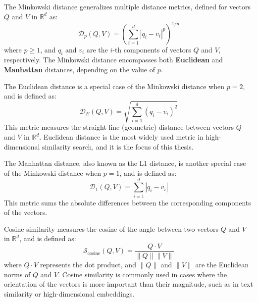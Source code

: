 \begin{definition}
    The Minkowski distance generalizes multiple distance metrics, defined for vectors \(Q\) and \(V\) in \(\mathbb{R}^d\) as:
    \begin{equation}
        \mathcal{D}_p(Q, V) = \left( \sum_{i=1}^{d} |q_i - v_i|^p \right)^{1/p}
        \label{eq:minkowski_distance}
    \end{equation}
    where \(p \geq 1\), and \(q_i\) and \(v_i\) are the \(i\)-th components of vectors \(Q\) and \(V\), respectively. The Minkowski distance encompasses both \textbf{Euclidean} and \textbf{Manhattan} distances, depending on the value of \(p\).
\end{definition}

\begin{definition}
    The Euclidean distance is a special case of the Minkowski distance when \(p = 2\), and is defined as:
    \begin{equation}
        \mathcal{D}_E(Q, V) = \sqrt{\sum_{i=1}^{d} (q_i - v_i)^2}
        \label{eq:euclidean_distance}
    \end{equation}
    This metric measures the straight-line (geometric) distance between vectors \(Q\) and \(V\) in \(\mathbb{R}^d\). Euclidean distance is the most widely used metric in high-dimensional similarity search, and it is the focus of this thesis.
\end{definition}

\begin{definition}
    The Manhattan distance, also known as the L1 distance, is another special case of the Minkowski distance when \(p = 1\), and is defined as:
    \begin{equation}
        \mathcal{D}_1(Q, V) = \sum_{i=1}^{d} |q_i - v_i|
        \label{eq:manhattan_distance}
    \end{equation}
    This metric sums the absolute differences between the corresponding components of the vectors.
\end{definition}

\begin{definition}
    Cosine similarity measures the cosine of the angle between two vectors \(Q\) and \(V\) in \(\mathbb{R}^d\), and is defined as:
    \begin{equation}
        \mathcal{S}_{\text{cosine}}(Q, V) = \frac{Q \cdot V}{\|Q\| \|V\|}
        \label{eq:cosine_similarity}
    \end{equation}
    where \(Q \cdot V\) represents the dot product, and \(\|Q\|\) and \(\|V\|\) are the Euclidean norms of \(Q\) and \(V\). Cosine similarity is commonly used in cases where the orientation of the vectors is more important than their magnitude, such as in text similarity or high-dimensional embeddings.
\end{definition}

